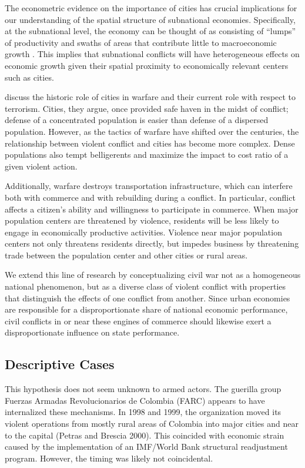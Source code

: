 The econometric evidence on the importance of cities has crucial implications for our understanding of the spatial structure of subnational economies. Specifically, at the subnational level, the economy can be thought of as consisting of ``lumps'' of productivity and swaths of areas that contribute little to macroeconomic growth \citep{venables:2005}. This implies that subnational conflicts will have heterogeneous effects on economic growth given their spatial proximity to economically relevant centers such as cities.

\citet{glaeser:shapiro:2002} discuss the historic role of cities in warfare and their current role with respect to terrorism. Cities, they argue, once provided safe haven in the midst of conflict; defense of a concentrated population is easier than defense of a dispersed population. However, as the tactics of warfare have shifted over the centuries, the relationship between violent conflict and cities has become more complex. Dense populations also tempt belligerents and maximize the impact to cost ratio of a given violent action. 

Additionally, warfare destroys transportation infrastructure, which can interfere both with commerce and with rebuilding during a conflict. In particular, conflict affects a citizen's ability and willingness to participate in commerce. When major population centers are threatened by violence, residents will be less likely to engage in economically productive activities. Violence near major population centers not only threatens residents directly, but impedes business by threatening trade between the population center and other cities or rural areas. 

We extend this line of research by conceptualizing civil war not as a homogeneous national phenomenon, but as a diverse class of violent conflict with properties that distinguish the effects of one conflict from another. Since urban economies are responsible for a disproportionate share of national economic performance, civil conflicts in or near these engines of commerce should likewise exert a disproportionate influence on state performance. 

\subsection{Descriptive Cases}

This hypothesis does not seem unknown to armed actors. The guerilla group Fuerzas Armadas Revolucionarios de Colombia (FARC) appears to have internalized these mechanisms. In 1998 and 1999, the organization moved its violent operations from mostly rural areas of Colombia into major cities and near to the capital (Petras and Brescia 2000). This coincided with economic strain caused by the implementation of an IMF/World Bank structural readjustment program. However, the timing was likely not coincidental. 

